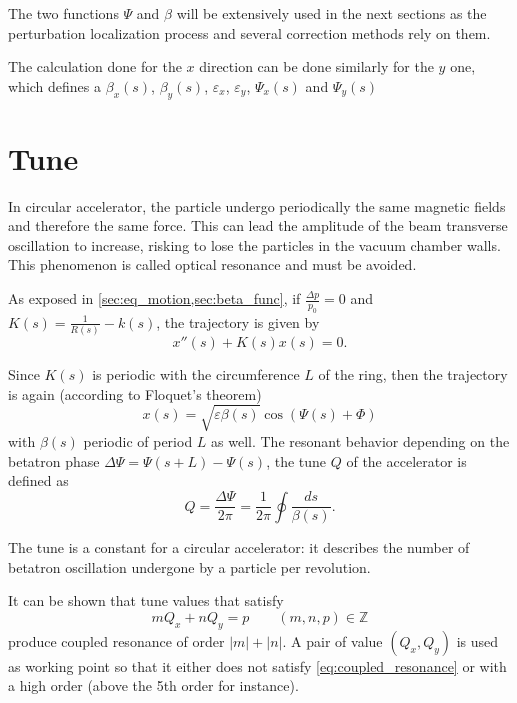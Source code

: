 The two functions $\Psi$ and $\beta$ will be extensively used in the next sections as the perturbation localization process and several correction methods rely on them.

\remark The calculation done for the $x$ direction can be done similarly for the $y$ one, which defines a $\beta_x(s)$, $\beta_y(s)$, $\varepsilon_x$, $\varepsilon_y$, $\Psi_x(s)$ and $\Psi_y(s)$

\section{Tune}
In circular accelerator, the particle undergo periodically the same magnetic fields and therefore the same force. This can lead the amplitude of the beam transverse oscillation to increase, risking to lose the particles in the vacuum chamber walls. This phenomenon is called optical resonance and must be avoided.

As exposed in \cref{sec:eq_motion,sec:beta_func}, if $\frac{\Delta p}{p_0} = 0$ and $K(s)=\frac{1}{R(s)}-k(s)$, the trajectory is given by
\begin{equation}
x''(s)+K(s) x(s) = 0.
\end{equation}

Since $K(s)$ is periodic with the circumference $L$ of the ring, then the trajectory is again (according to Floquet's theorem)
\begin{equation}
x(s) = \sqrt{\varepsilon \beta(s)} \cos\left(\Psi(s)+\Phi\right)
\end{equation}
with $\beta(s)$ periodic of period $L$ as well. The resonant behavior depending on the betatron phase $\Delta \Psi = \Psi(s+L)-\Psi(s)$, the tune $Q$ of the accelerator is defined as
\begin{equation}
\label{eq:tune}
Q = \frac{\Delta \Psi}{2 \pi} = \frac{1}{2 \pi} \oint\frac{ds}{\beta(s)}.
\end{equation}

The tune is a constant for a circular accelerator: it describes the number of betatron oscillation undergone by a particle per revolution.

It can be shown that tune values that satisfy
\begin{equation}
\label{eq:coupled_resonance}
m Q_x + n Q_y = p \qquad (m, n, p) \in \mathbb{Z}
\end{equation}
produce coupled resonance of order $|m|+|n|$. A pair of value $(Q_x,Q_y)$ is used as working point so that it either does not satisfy \cref{eq:coupled_resonance} or with a high order (above the 5th order for instance).

